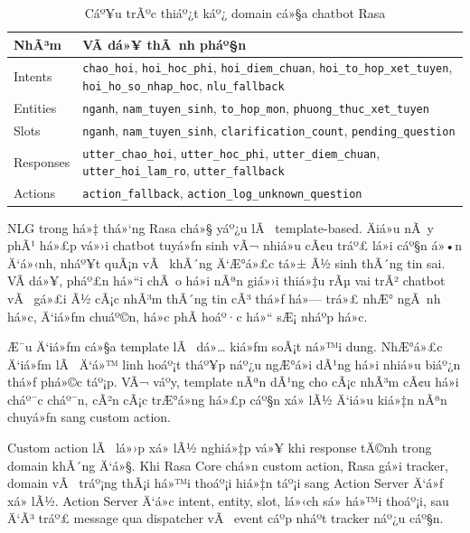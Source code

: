 ﻿\documentclass[12pt,a4paper]{report}
\begin{document}
\begin{table}[H]
\centering
\begin{tabular}{|p{3.5cm}|p{9cm}|}
\hline
\textbf{NhÃ³m} & \textbf{VÃ­ dá»¥ thÃ nh pháº§n} \\
\hline
Intents & \texttt{chao\_hoi}, \texttt{hoi\_hoc\_phi}, \texttt{hoi\_diem\_chuan}, \texttt{hoi\_to\_hop\_xet\_tuyen}, \texttt{hoi\_ho\_so\_nhap\_hoc}, \texttt{nlu\_fallback} \\
\hline
Entities & \texttt{nganh}, \texttt{nam\_tuyen\_sinh}, \texttt{to\_hop\_mon}, \texttt{phuong\_thuc\_xet\_tuyen} \\
\hline
Slots & \texttt{nganh}, \texttt{nam\_tuyen\_sinh}, \texttt{clarification\_count}, \texttt{pending\_question} \\
\hline
Responses & \texttt{utter\_chao\_hoi}, \texttt{utter\_hoc\_phi}, \texttt{utter\_diem\_chuan}, \texttt{utter\_hoi\_lam\_ro}, \texttt{utter\_fallback} \\
\hline
Actions & \texttt{action\_fallback}, \texttt{action\_log\_unknown\_question} \\
\hline
\end{tabular}
\caption{Cáº¥u trÃºc thiáº¿t káº¿ domain cá»§a chatbot Rasa}
\label{tab:rasa-domain-design}
\end{table}

NLG trong há»‡ thá»‘ng Rasa chá»§ yáº¿u lÃ  template-based. Äiá»u nÃ y phÃ¹ há»£p vá»›i chatbot tuyá»ƒn sinh vÃ¬ nhiá»u cÃ¢u tráº£ lá»i cáº§n á»•n Ä‘á»‹nh, nháº¥t quÃ¡n vÃ  khÃ´ng Ä‘Æ°á»£c tá»± Ã½ sinh thÃ´ng tin sai. VÃ­ dá»¥, pháº£n há»“i chÃ o há»i nÃªn giá»›i thiá»‡u rÃµ vai trÃ² chatbot vÃ  gá»£i Ã½ cÃ¡c nhÃ³m thÃ´ng tin cÃ³ thá»ƒ há»— trá»£ nhÆ° ngÃ nh há»c, Ä‘iá»ƒm chuáº©n, há»c phÃ­ hoáº·c há»“ sÆ¡ nháº­p há»c.

Æ¯u Ä‘iá»ƒm cá»§a template lÃ  dá»… kiá»ƒm soÃ¡t ná»™i dung. NhÆ°á»£c Ä‘iá»ƒm lÃ  Ä‘á»™ linh hoáº¡t tháº¥p náº¿u ngÆ°á»i dÃ¹ng há»i nhiá»u biáº¿n thá»ƒ phá»©c táº¡p. VÃ¬ váº­y, template nÃªn dÃ¹ng cho cÃ¡c nhÃ³m cÃ¢u há»i cháº¯c cháº¯n, cÃ²n cÃ¡c trÆ°á»ng há»£p cáº§n xá»­ lÃ½ Ä‘iá»u kiá»‡n nÃªn chuyá»ƒn sang custom action.

Custom action lÃ  lá»›p xá»­ lÃ½ nghiá»‡p vá»¥ khi response tÄ©nh trong domain khÃ´ng Ä‘á»§. Khi Rasa Core chá»n custom action, Rasa gá»­i tracker, domain vÃ  tráº¡ng thÃ¡i há»™i thoáº¡i hiá»‡n táº¡i sang Action Server Ä‘á»ƒ xá»­ lÃ½. Action Server Ä‘á»c intent, entity, slot, lá»‹ch sá»­ há»™i thoáº¡i, sau Ä‘Ã³ tráº£ message qua dispatcher vÃ  event cáº­p nháº­t tracker náº¿u cáº§n.
\end{document}

